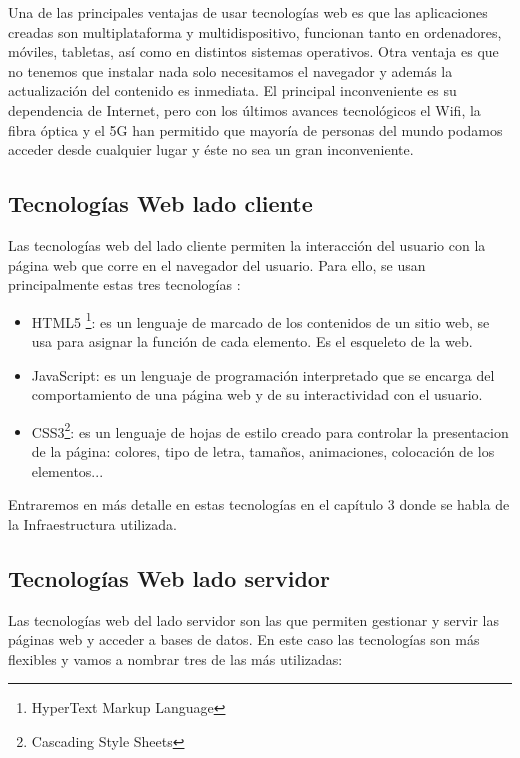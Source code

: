 Una de las principales ventajas de usar tecnologías web es que las aplicaciones creadas son multiplataforma y multidispositivo, funcionan tanto en ordenadores, móviles, tabletas, así como en distintos sistemas operativos. Otra ventaja es que no tenemos que instalar nada solo necesitamos el navegador y además la actualización del contenido es inmediata. El principal inconveniente es su dependencia de Internet, pero con los últimos avances tecnológicos el Wifi, la fibra óptica y el 5G han permitido que  mayoría de personas del mundo podamos acceder desde cualquier lugar y éste no sea un gran inconveniente.


\subsection{Tecnologías Web lado cliente}
Las tecnologías web del lado cliente  permiten la interacción del usuario con la página web que corre en el navegador del usuario. Para ello, se usan principalmente estas tres tecnologías \cite{tecnologiascliente}:

\begin{itemize}
  \item HTML5 \footnote{HyperText Markup Language}: es un lenguaje de marcado de los contenidos de un sitio web, se usa para asignar la función de cada elemento. Es el esqueleto de la web.
  \item JavaScript: es un lenguaje de programación interpretado que se encarga del comportamiento de una página web y de su interactividad con el usuario.
  \item CSS3\footnote{Cascading Style Sheets}: es un lenguaje de hojas de estilo creado para controlar la presentacion de la página: colores, tipo de letra, tamaños, animaciones, colocación de los elementos...
\end{itemize}

Entraremos en más detalle en estas tecnologías en el capítulo 3 donde se habla de la Infraestructura utilizada.

\newpage
\subsection{Tecnologías Web lado servidor}
Las tecnologías web del lado servidor son las que permiten gestionar y servir las páginas web y acceder a bases de datos. En este caso las tecnologías son más flexibles y vamos a nombrar tres de las más utilizadas:

